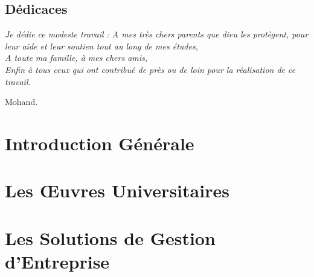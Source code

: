 \documentclass[11pt,a4paper,onecolumn,openright,oneside]{report}
\begin{document}
    \chapter*{\huge Dédicaces}
	
	\begin{center}
		\it \Large
		Je dédie ce modeste travail :
		A mes très chers parents que dieu les
		protègent, pour leur aide et leur soutien tout au long
		de mes études,\\
		
		A toute ma famille, à mes chers amis,\\
		
		Enfin à tous ceux qui ont contribué de près
		ou de loin pour la réalisation de ce travail.\\
		
		\leftskip=12cm
		
		Mohand.
		
		\leftskip=0cm
		
	\end{center}
	
	\tableofcontents
	\listoffigures
	\listoftables

	\pagestyle{fancy}
	\fancyhead{}
	
	\renewcommand{\chaptermark}[1]{\markboth{\bsc{\chaptername~\thechapter{} :} #1}{}}
	
	\lhead[\textsl{\rightmark}]{\textsl{\leftmark}}
	
	\renewcommand{\headrulewidth}{1.2pt}
	
	\newcommand\blfootnote[1]{
		\begingroup
		\renewcommand\thefootnote{}\footnote{#1}
		\addtocounter{footnote}{-1}
		\endgroup
	}

	\part*{Introduction Générale}
		

    \part{Les Œuvres Universitaires}
        

	\part{Les Solutions de Gestion d'Entreprise}
        

	
\end{document}
